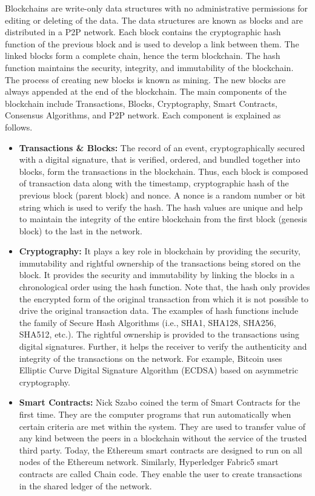 \documentclass[conference]{IEEEtran}
\begin{document}
Blockchains are write-only data structures with no administrative permissions for editing or deleting of the data. The data structures are known as blocks and are distributed in a P2P network. Each block contains the cryptographic hash function of the previous block and is used to develop a link between them. The linked blocks form a complete chain, hence the term blockchain. The hash function maintains the security, integrity, and immutability of the blockchain. The process of creating new blocks is known as mining. The new blocks are always appended at the end of the blockchain. The main components of the blockchain include Transactions, Blocks, Cryptography, Smart Contracts, Consensus Algorithms, and P2P network. Each component is explained as follows. 
\begin{itemize}
	\item \textbf{Transactions \& Blocks:} The record of an event, cryptographically secured with a digital signature, that is veriﬁed, ordered, and bundled together into blocks, form the transactions in the blockchain. Thus, each block is composed of transaction data along with the timestamp, cryptographic hash of the previous block (parent block) and nonce. A nonce is a random number or bit string which is used to verify the hash. The hash values are unique and help to maintain the integrity of the entire blockchain from the ﬁrst block (genesis block) to the last in the network. 
	
	\item \textbf{Cryptography:} It plays a key role in blockchain by providing the security, immutability and rightful ownership of the transactions being stored on the block. It provides the security and immutability by linking the blocks in a chronological order using the hash function. Note that, the hash only provides the encrypted form of the original transaction from which it is not possible to drive the original transaction data. The examples of hash functions include the family of Secure Hash Algorithms (i.e., SHA1, SHA128, SHA256, SHA512, etc.). The rightful ownership is provided to the transactions using digital signatures. Further, it helps the receiver to verify the authenticity and integrity of the transactions on the network. For example, Bitcoin\cite{b6} uses Elliptic Curve Digital Signature Algorithm (ECDSA) based on asymmetric cryptography.
	
	\item \textbf{Smart Contracts: }Nick Szabo coined the term of Smart Contracts for the ﬁrst time. They are the computer programs that run automatically when certain criteria are met within the system. They are used to transfer value of any kind between the peers in a blockchain without the service of the trusted third party. Today, the Ethereum smart contracts are designed to run on all nodes of the Ethereum network. Similarly, Hyperledger Fabric5 smart contracts are called Chain code. They enable the user to create transactions in the shared ledger of the network. 
	

\end{itemize}
\end{document}
